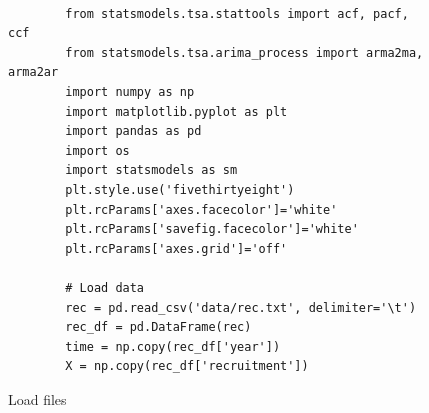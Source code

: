 \begin{figure}[hbt!]
    \begin{lstlisting}

        from statsmodels.tsa.stattools import acf, pacf, ccf
        from statsmodels.tsa.arima_process import arma2ma, arma2ar
        import numpy as np
        import matplotlib.pyplot as plt
        import pandas as pd
        import os
        import statsmodels as sm
        plt.style.use('fivethirtyeight')
        plt.rcParams['axes.facecolor']='white'
        plt.rcParams['savefig.facecolor']='white'
        plt.rcParams['axes.grid']='off'
        
        # Load data
        rec = pd.read_csv('data/rec.txt', delimiter='\t')
        rec_df = pd.DataFrame(rec)
        time = np.copy(rec_df['year'])
        X = np.copy(rec_df['recruitment'])
    \end{lstlisting}
\caption{Load files}
\label{Kode2}
\end{figure}

